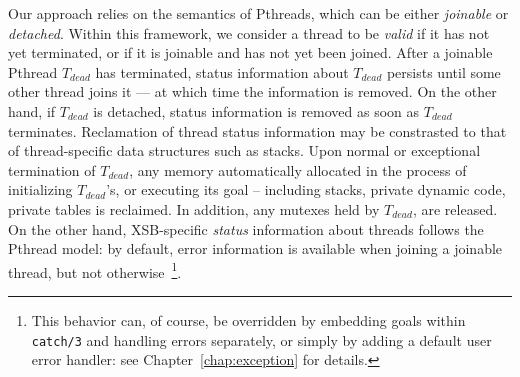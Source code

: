 Our approach relies on the semantics of Pthreads, which can be either
{\em joinable} or {\em detached}.  Within this framework, we consider
a thread to be {\em valid} if it has not yet terminated, or if it is
joinable and has not yet been joined.  After a joinable Pthread
$T_{dead}$ has terminated, status information about $T_{dead}$
persists until some other thread joins it --- at which time the
information is removed.  On the other hand, if $T_{dead}$ is detached,
status information is removed as soon as $T_{dead}$ terminates.
Reclamation of thread status information may be constrasted to that of
thread-specific data structures such as stacks.  Upon normal or
exceptional termination of $T_{dead}$, any memory automatically
allocated in the process of initializing $T_{dead}$'s, or executing
its goal -- including stacks, private dynamic code, private tables is
reclaimed.  In addition, any mutexes held by $T_{dead}$, are released.
On the other hand, XSB-specific {\em status} information about threads
follows the Pthread model: by default, error information is available
when joining a joinable thread, but not otherwise~\footnote{This
  behavior can, of course, be overridden by embedding goals within
  {\tt catch/3} and handling errors separately, or simply by adding a
  default user error handler: see Chapter~\ref{chap:exception} for
  details.}.

